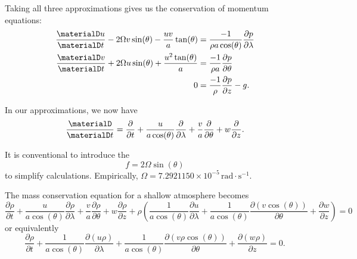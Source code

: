 \begin{prop}
Taking all three approximations gives us the conservation of momentum equations:
\begin{subequations}
  \begin{align}
    \frac{\materialD u}{\materialD t}
    - 2\Omega v\sin(\theta) - \frac{uv}{a}\tan(\theta)
    &= \frac{-1}{\rho a\cos(\theta)}\frac{\partial p}{\partial\lambda}\\
    \frac{\materialD v}{\materialD t}
    + 2\Omega u\sin(\theta) + \frac{u^{2}\tan(\theta)}{a}
    &= \frac{-1}{\rho a}\frac{\partial p}{\partial\theta} \\
    0 &= \frac{-1}{\rho}\frac{\partial p}{\partial z}-g.
  \end{align}
\end{subequations}
\end{prop}

\begin{note}
In our approximations, we now have
\begin{equation}
  \frac{\materialD}{\materialD t}=\frac{\partial}{\partial t} +
  \frac{u}{a\cos(\theta)}\frac{\partial}{\partial\lambda} +
  \frac{v}{a}\frac{\partial}{\partial\theta} + w\frac{\partial}{\partial z}.
\end{equation}
\end{note}

\begin{defn}
It is conventional to introduce the 
\begin{equation}
  f = 2\Omega\sin(\theta)
\end{equation}
to simplify calculations. Empirically, $\Omega=7.2921150\times10^{-5}\,\mathrm{rad}\cdot\mathrm{s}^{-1}$.
\end{defn}


\begin{prop}
The mass conservation equation for a shallow atmosphere becomes
\begin{equation}
  \frac{\partial\rho}{\partial t}
  + \frac{u}{a\cos(\theta)}\frac{\partial\rho}{\partial\lambda}
  + \frac{v}{a}\frac{\partial\rho}{\partial\theta}
  + w\frac{\partial\rho}{\partial z}
  + \rho\left(\frac{1}{a\cos(\theta)}\frac{\partial u}{\partial\lambda}
              + \frac{1}{a\cos(\theta)}\frac{\partial(v\cos(\theta))}{\partial\theta}
              + \frac{\partial w}{\partial z}
       \right)
  = 0
\end{equation}
or equivalently
\begin{equation}
  \frac{\partial\rho}{\partial t}
  + \frac{1}{a\cos(\theta)}\frac{\partial(u\rho)}{\partial\lambda}
  + \frac{1}{a\cos(\theta)}\frac{\partial(v\rho\cos(\theta))}{\partial\theta}
  + \frac{\partial(w\rho)}{\partial z}
  = 0.
\end{equation}
\end{prop}

